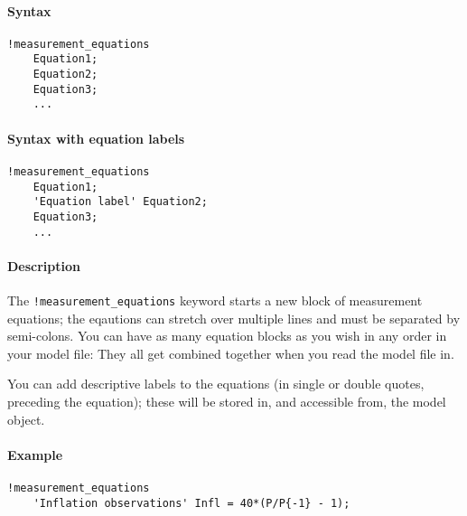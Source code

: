 


	\paragraph{Syntax}\label{syntax}

\begin{verbatim}
!measurement_equations
    Equation1;
    Equation2;
    Equation3;
    ...
\end{verbatim}

\paragraph{Syntax with equation
labels}\label{syntax-with-equation-labels}

\begin{verbatim}
!measurement_equations
    Equation1;
    'Equation label' Equation2;
    Equation3;
    ...
\end{verbatim}

\paragraph{Description}\label{description}

The \texttt{!measurement\_equations} keyword starts a new block of
measurement equations; the eqautions can stretch over multiple lines and
must be separated by semi-colons. You can have as many equation blocks
as you wish in any order in your model file: They all get combined
together when you read the model file in.

You can add descriptive labels to the equations (in single or double
quotes, preceding the equation); these will be stored in, and accessible
from, the model object.

\paragraph{Example}\label{example}

\begin{verbatim}
!measurement_equations
    'Inflation observations' Infl = 40*(P/P{-1} - 1);
\end{verbatim}


